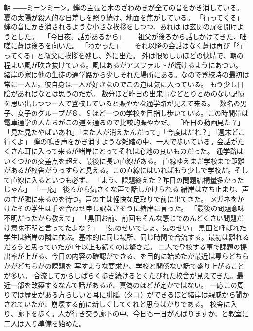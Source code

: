 \documentclass[uplatex]{utbook}
\begin{document}
朝
――ミーンミーン。蝉の主張と木のざわめきが全ての音をかき消している。夏の太陽が殺人的な日差しを照り続け、地面を焦がしている。
「行ってくる」　　 
蝉の音にかき消されるような小さな挨拶をしつつ、あれは は玄関の扉を開けようとした。　
「今日夜、話があるから」　　
祖父が後ろから話しかけてきた、咄嗟に蒼は後ろを向いた。
「わかった」　　
それ以降の会話はなく蒼は再び「行ってくる」と叔父に挨拶を残し、外に出た。
外は恨めしいほどの快晴で、朝の程よい風が吹き抜けている。風はあるがアスファルトが焼けるようにあつい。
緒岸の家は他の生徒の通学路から少しそれた場所にある。なので登校時の最初は常に一人だ。彼自身は一人が好きなのでこの道は気に入っている。
もう少し日陰があればなとは思うのだが。
数分ほど昨日の出来事などとりとめのない記憶を思い出しつつ一人で登校していると賑やかな通学路が見えて来る。　
数名の男子、女子のグループが８、９ほど一つの学校を目指し歩いている。この時間帯は電車通学の人たちがこの道を通るので比較的賑やかだ。
「昨日の動画見た？」「見た見たやばいあれ」「また人が消えたんだって」「今度はだれ？」「週末どこ行くよ」
蝉の鳴き声をかき消すような雑踏の中、一人で歩いている。会話がたくさん耳に入って来るが緒岸にとってそれは心地の良いものだった。
通学路はいくつかの交差点を超え、最後に長い直線がある。
直線ゆえまだ学校まで距離があるが校舎がうっすらと見える。この直線にはいればもう少しで学校だ。そして直線に入るといつも必ず、
「よう、課題終えた？昨日の問題結構量多かったじゃん」
「一応」
後ろから気さくな声で話しかけられる
緒岸は立ち止まり、声の主が隣に来るのを待つ。声の主は軽快な足取りで前に出てきた。
メガネをかけたその学生は手を合わせ申し訳なさそうに緒岸に言った。
「最後の問題意味不明だったから教えて」
「黒田お前、前回もそんな感じでめんどくさい問題だけ意味不明と言ってたよな？」
「気のせいでしょ、気のせい」
黒田と呼ばれた学生は緒岸の隣に並ぶ。基本的に同じ場所、同じ時間で合流する。最初は離れるだろうと思っていたが1年以上も続くのは驚きだ。
二人で登校する事で課題の提出率が上がる、今日の内容の確認ができる、を目的に始めたが最近は専らどちらかがどちらかの課題を
写すような要求か、学校と関係ない話で盛り上がることが多い。
合流してからしばらく歩き続けるとくたびれた校舎が見えてきた。最近一部を改築するなんて話があるが、真偽のほどが定かではない。
一応この周りでは歴史がある方らしいと耳に胼胝（タコ）ができるほど緒岸は親戚から聞かされていたが、崩壊する前に新しくしてくれと思うばかりである。
校舎に入り、廊下を歩く。人が行き交う廊下の中、今日も一日がんばりますか、と教室に二人は入り準備を始めた。
\end{document}
